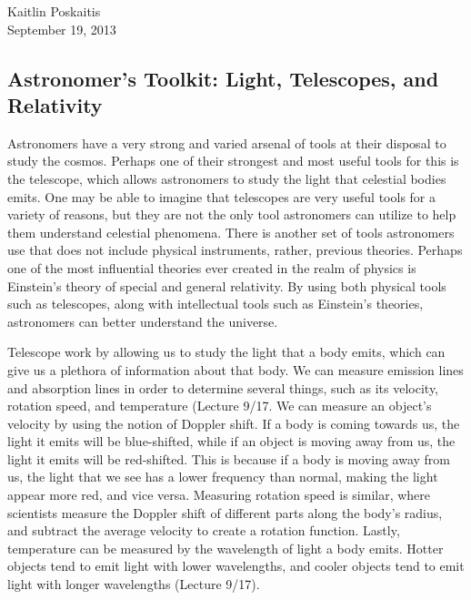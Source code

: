 \documentclass[14pt]{article}
\begin{document}
\noindent Kaitlin Poskaitis\\
September 19, 2013
\begin{center} \section*{\bf Astronomer’s Toolkit: Light, Telescopes, and Relativity}
\end{center}

\vspace{5mm}
Astronomers have a very strong and varied arsenal of tools at their disposal to
study the cosmos.  Perhaps one of their strongest and most useful tools for this
is the telescope, which allows astronomers to study the light that celestial
bodies emits.  One may be able to imagine that telescopes are very useful tools
for a variety of reasons, but they are not the only tool astronomers can utilize
to help them understand celestial phenomena.  There is another set of tools
astronomers use that does not include physical instruments, rather, previous
theories.  Perhaps one of the most influential theories ever created in the
realm of physics is Einstein's theory of special and general relativity.  By
using both physical tools such as telescopes, along with intellectual tools such
as Einstein's theories, astronomers can better understand the universe.

\vspace{5mm}
Telescope work by allowing us to study the light that a body emits, which can
give us a plethora of information about that body.  We can measure emission
lines and absorption lines in order to determine several things, such as its
velocity, rotation speed, and temperature (Lecture 9/17.  We can measure an
object's velocity
by using the notion of Doppler shift.  If a body is coming towards us, the light
it emits will be blue-shifted, while if an object is moving away from us, the
light it emits will be red-shifted.  This is because if a body is moving away
from us, the light that we see has a lower frequency than normal, making the
light appear more red, and vice versa.  Measuring rotation speed is similar,
where scientists measure the Doppler shift of different parts along the body's
radius, and subtract the average velocity to create a rotation function.
Lastly, temperature can be measured by the wavelength of light a body emits.
Hotter objects tend to emit light with lower wavelengths, and cooler objects
tend to emit light with longer wavelengths (Lecture 9/17).
\end{document}
